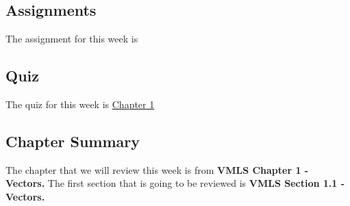 \subsection{Assignments}

The assignment for this week is   

\subsection{Quiz}

The quiz for this week is \href{https://applied.cs.colorado.edu/mod/quiz/view.php?id=50674}{Chapter 1} \textbullet {}  

\subsection{Chapter Summary}

The chapter that we will review this week is from \textbf{VMLS Chapter 1 - Vectors.} The first section that is going to be reviewed is \textbf{VMLS Section 1.1 - Vectors.}

